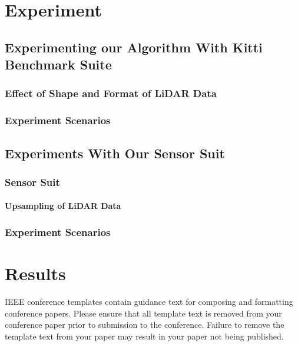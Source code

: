 \documentclass[conference]{IEEEtran}
\begin{document}
\section{Experiment}

\subsection{Experimenting our Algorithm With Kitti Benchmark Suite}

\subsubsection{Effect of Shape and Format of LiDAR Data}
\subsubsection{Experiment Scenarios}

\subsection{Experiments With Our Sensor Suit}

\subsubsection{Sensor Suit}
\paragraph{Upsampling of LiDAR Data}

\subsubsection{Experiment Scenarios}


\section{Results}



\vspace{12pt}
\color{red}
IEEE conference templates contain guidance text for composing and formatting conference papers. Please ensure that all template text is removed from your conference paper prior to submission to the conference. Failure to remove the template text from your paper may result in your paper not being published.
\end{document}
